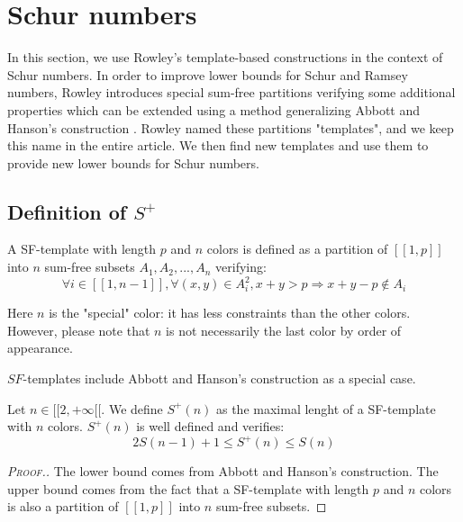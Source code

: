 \section{Schur numbers}
\label{Schur}

\qquad In this section, we use Rowley's template-based constructions \cite{RowleyRamsey} in the context of Schur 
numbers. In order to improve lower bounds for Schur and Ramsey numbers, Rowley introduces special sum-free 
partitions verifying some additional properties which can be extended using a method generalizing Abbott and 
Hanson's construction \cite{AbbottHanson}. Rowley named these partitions "templates", and we keep this name in 
the entire article. We then find new templates and use them to provide new lower bounds for Schur numbers.

\subsection{Definition of \(S^+\)}

\begin{definition}
A SF-template with length \(p\) and \(n\) colors is defined as a partition of \( [\![1,p]\!]\) into \(n\) sum-free subsets 
\(A_1, A_2, ..., A_n\) verifying:
\[
\forall i \in [\![1, n-1]\!], \forall (x,y) \in A_i^2, x+y > p
\Longrightarrow x+y-p \notin A_i
\]
\end{definition}

\begin{remark}
	Here \(n\) is the "special" color: it has less constraints than the other colors. However, please note that \(n\) 
	is not necessarily the last color by order of appearance.
\end{remark}

\begin{remark}
	\(SF\)-templates include Abbott and Hanson's construction \cite{AbbottHanson} as a special case.
\end{remark}

\begin{proposition}
	Let \(n \in [\![2, +\infty[\![\). We define \(S^+(n)\) as the maximal lenght of a SF-template with \(n\) colors. 
	\(S^+(n)\) is well defined and verifies:
	\[
	2S(n-1)+1 \leqslant S^+(n) \leqslant S(n)
	\]
\end{proposition}

\begin{proof}[\textsc{Proof.}]
The lower bound comes from Abbott and Hanson's construction. The upper bound comes from the 
fact that a SF-template with length \(p\) and \(n\) colors is also a partition of \([\![1, p]\!]\) into \(n\) sum-free subsets.
\end{proof}

